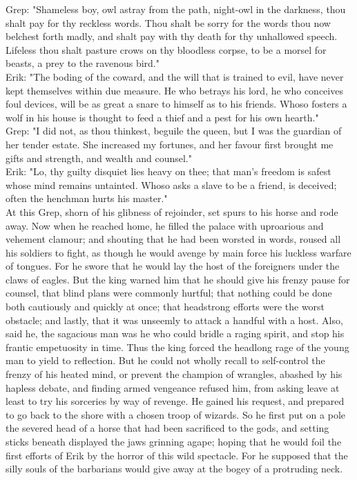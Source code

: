 \documentclass[10pt,a4paper]{report}
\begin{document}
Grep: "Shameless boy, owl astray from the path, night-owl in the darkness, thou shalt pay for thy reckless words. Thou shalt be sorry for the words thou now belchest forth madly, and shalt pay with thy death for thy unhallowed speech. Lifeless thou shalt pasture crows on thy bloodless corpse, to be a morsel for beasts, a prey to the ravenous bird."\\

Erik: "The boding of the coward, and the will that is trained to evil, have never kept themselves within due measure. He who betrays his lord, he who conceives foul devices, will be as great a snare to himself as to his friends. Whoso fosters a wolf in his house is thought to feed a thief and a pest for his own hearth."\\

Grep: "I did not, as thou thinkest, beguile the queen, but I was the guardian of her tender estate. She increased my fortunes, and her favour first brought me gifts and strength, and wealth and counsel."\\

Erik: "Lo, thy guilty disquiet lies heavy on thee; that man's freedom is safest whose mind remains untainted. Whoso asks a slave to be a friend, is deceived; often the henchman hurts his master."\\

At this Grep, shorn of his glibness of rejoinder, set spurs to his horse and rode away. Now when he reached home, he filled the palace with uproarious and vehement clamour; and shouting that he had been worsted in words, roused all his soldiers to fight, as though he would avenge by main force his luckless warfare of tongues. For he swore that he would lay the host of the foreigners under the claws of eagles. But the king warned him that he should give his frenzy pause for counsel, that blind plans were commonly hurtful; that nothing could be done both cautiously and quickly at once; that headstrong efforts were the worst obstacle; and lastly, that it was unseemly to attack a handful with a host. Also, said he, the sagacious man was he who could bridle a raging spirit, and stop his frantic empetuosity in time. Thus the king forced the headlong rage of the young man to yield to reflection. But he could not wholly recall to self-control the frenzy of his heated mind, or prevent the champion of wrangles, abashed by his hapless debate, and finding armed vengeance refused him, from asking leave at least to try his sorceries by way of revenge. He gained his request, and prepared to go back to the shore with a chosen troop of wizards. So he first put on a pole the severed head of a horse that had been sacrificed to the gods, and setting sticks beneath displayed the jaws grinning agape; hoping that he would foil the first efforts of Erik by the horror of this wild spectacle. For he supposed that the silly souls of the barbarians would give away at the bogey of a protruding neck.\\
\end{document}
